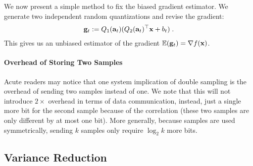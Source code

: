 We now present a simple method to fix the biased gradient estimator. We generate two independent random quantizations and revise the gradient:
\begin{align}
{\bf g}_t := Q_1 ({\bf a}_t) (Q_2 ({\bf a}_t)^\top {\bf x} + b_t) \; .
\label{eq:double}
\end{align}
This gives us an unbiased estimator of the gradient $\mathbb{E}({\bf g}_t) = \nabla f({\bf x})$. 

\paragraph*{Overhead of Storing Two Samples}
Acute readers may notice that one system implication of double sampling is the overhead of sending
two samples instead of one. We note that this will not introduce $2\times$
overhead in terms of data communication, instead, just a single more bit
for the second sample because of the correlation (these two samples 
are only different by at most one bit). More generally, because samples
are used symmetrically, sending $k$ samples only require $\log_2 k$ more bits.

\vspace{-0.5em}
\subsection{Variance Reduction}
\vspace{-0.5em}

